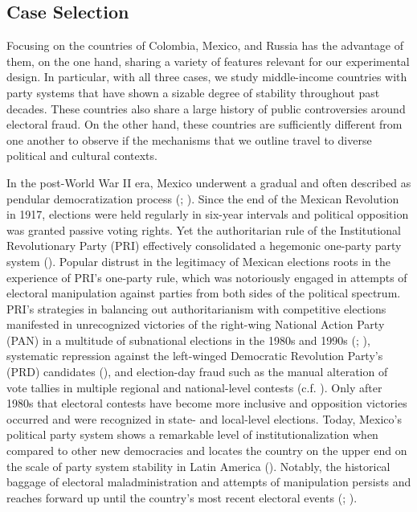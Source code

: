 \documentclass[11pt, ngerman,english,a4]{article}
\begin{document}
\subsection*{Case Selection}

Focusing on the countries of Colombia, Mexico, and Russia has the advantage of them, on the one hand, sharing a variety of features relevant for our experimental design. In particular, with all three cases, we study middle-income countries with party systems that have shown a sizable degree of stability throughout past decades. These countries also share a large history of public controversies around electoral fraud. On the other hand, these countries are sufficiently different from one another to observe if the mechanisms that we outline travel to diverse political and cultural contexts. 

In the post-World War II era, Mexico underwent a gradual and often described as pendular democratization process (\citealt{Cantu2015}; \citealt{Hiskey2005}). Since the end of the Mexican Revolution in 1917, elections were held regularly in six-year intervals and political opposition was granted passive voting rights. Yet the authoritarian rule of the Institutional Revolutionary Party (PRI) effectively consolidated a hegemonic one-party party system (\citealt{Sartori1976}).
Popular distrust in the legitimacy of Mexican elections roots in the experience of PRI's one-party rule, which was notoriously engaged in attempts of electoral manipulation against parties from both sides of the political spectrum. 
PRI's strategies in balancing out authoritarianism with competitive elections manifested in unrecognized victories of the right-wing National Action Party (PAN) in a multitude of subnational elections in the 1980s and 1990s (\citealt{Greene2007}; \citealt{Cantu2015}), systematic repression against the left-winged Democratic Revolution Party's (PRD) candidates (\citealt{Greene2007}), and election-day fraud such as the manual alteration of vote tallies in multiple regional and national-level contests (c.f. \citealt{Cantu2019b}).
Only after 1980s that electoral contests have become more inclusive and opposition victories occurred and were recognized in state- and local-level elections.
Today, Mexico's political party system shows a remarkable level of institutionalization when compared to other new democracies and locates the country on the upper end on the scale of party system stability in Latin America (\citealt{Greene2018}). Notably, the historical baggage of electoral maladministration and attempts of manipulation persists and reaches forward up until the country's most recent electoral events (\citealt{Cantu2014}; \citealt{Cantu2019a}). 
\end{document}
